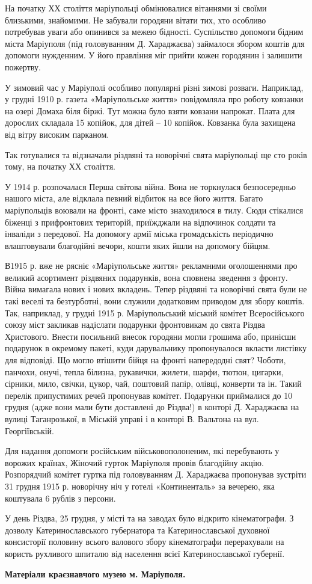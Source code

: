 На початку ХХ століття маріупольці обмінювалися вітаннями зі своїми близькими,
знайомими. Не забували городяни вітати тих, хто особливо потребував уваги або
опинився за межею бідності. Суспільство допомоги бідним міста Маріуполя (під
головуванням Д. Хараджаєва) займалося збором коштів для допомоги нужденним. У
його правління міг прийти кожен городянин і залишити пожертву.

У зимовий час у Маріуполі особливо популярні різні зимові розваги. Наприклад, у
грудні 1910 р. газета «Маріупольське життя» повідомляла про роботу ковзанки на
озері Домаха біля біржі. Тут можна було взяти ковзани напрокат. Плата для
дорослих складала 15 копійок, для дітей – 10 копійок. Ковзанка була захищена
від вітру високим парканом.

Так готувалися та відзначали різдвяні та новорічні свята маріупольці ще сто
років тому, на початку ХХ століття.

У 1914 р. розпочалася Перша світова війна. Вона не торкнулася безпосередньо
нашого міста, але відклала певний відбиток на все його життя. Багато
маріупольців воювали на фронті, саме місто знаходилося в тилу. Сюди стікалися
біженці з прифронтових територій, приїжджали на відпочинок солдати та інваліди
з передової. На допомогу армії міська громадськість періодично влаштовували
благодійні вечори, кошти яких йшли на допомогу бійцям.

В1915 р. вже не рясніє «Маріупольське життя» рекламними оголошеннями про
великий асортимент різдвяних подарунків, вона сповнена зведення з фронту. Війна
вимагала нових і нових вкладень. Тепер різдвяні та новорічні свята були не такі
веселі та безтурботні, вони служили додатковим приводом для збору коштів. Так,
наприклад, у грудні 1915 р. Маріупольський міський комітет Всеросійського союзу
міст закликав надіслати подарунки фронтовикам до свята Різдва Христового.
Внести посильний внесок городяни могли грошима або, принісши подарунок в
окремому пакеті, куди дарувальнику пропонувалося вкласти листівку для
відповіді. Що могло втішити бійця на фронті напередодні свят? Чоботи, панчохи,
онучі, тепла білизна, рукавички, жилети, шарфи, тютюн, цигарки, сірники, мило,
свічки, цукор, чай, поштовий папір, олівці, конверти та ін. Такий перелік
припустимих речей пропонував комітет. Подарунки приймалися до 10 грудня (адже
вони мали бути доставлені до Різдва!) в конторі Д. Хараджаєва на вулиці
Таганрозької, в Міській управі і в конторі В. Вальтона на вул. Георгіївській.

Для надання допомоги російським військовополоненим, які перебувають у ворожих
країнах, Жіночий гурток Маріуполя провів благодійну акцію. Розпорядчий комітет
гуртка під головуванням Д. Хараджаєва пропонував зустріти 31 грудня 1915 р.
новорічну ніч у готелі «Континенталь» за вечерею, яка коштувала 6 рублів з
персони.

У день Різдва, 25 грудня, у місті та на заводах було відкрито кінематографи. З
дозволу Катеринославського губернатора та Катеринославської духовної
консисторії половину всього валового збору кінематографи перерахували на
користь рухливого шпиталю від населення всієї Катеринославської губернії.

\textbf{Матеріали краєзнавчого музею м. Маріуполя.}
